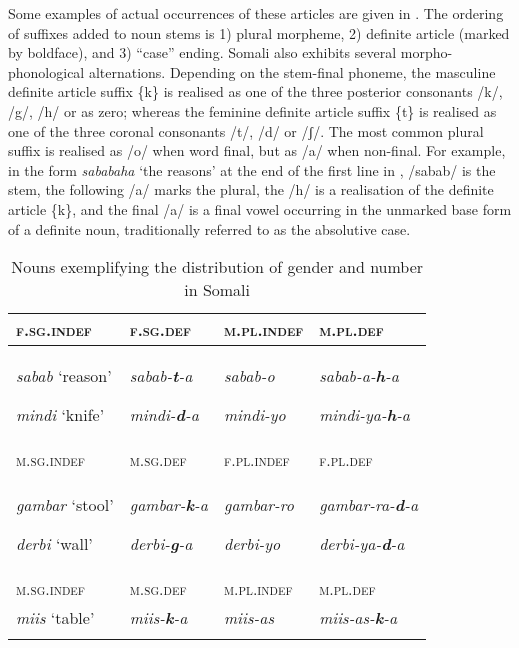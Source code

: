\documentclass[output=paper]{langsci/langscibook}
\begin{document}
Some examples of actual occurrences of these articles are given in . The ordering of suffixes added to noun stems is 
1) plural morpheme, 
2) definite article (marked by boldface), 
and 3) “case” ending. Somali also exhibits several morpho-phonological alternations. Depending on the stem-final phoneme, the masculine definite article suffix \{k\} is realised as one of the three posterior consonants /k/, /g/, /h/ or as zero; whereas the feminine definite article suffix \{t\} is realised as one of the three coronal consonants /t/, /d/ or /ʃ/. The most common plural suffix is realised as /o/ when word final, but as /a/ when non-final. For example, in the form \textit{sababaha} ‘the reasons’ at the end of the first line in , /sabab/ is the stem, the following /a/ marks the plural, the /h/ is a realisation of the definite article \{k\}, and the final /a/ is a final vowel occurring in the unmarked base form of a definite noun, traditionally referred to as the absolutive case.
 
\begin{table}
\caption{Nouns exemplifying the distribution of gender and number in Somali}
\label{tab:2}

\begin{tabularx}{\textwidth}{XXXX}
\lsptoprule
{\textsc{f.sg.indef}} & {\textsc{f.sg.def}} & {\textsc{m.pl.indef}} & {\textsc{m.pl.def}}\\
\midrule
{\textit{sabab} ‘reason’}

{\textit{mindi} ‘knife’} & {\textit{sabab-}\textbf{\textit{t}}\textit{-a}}

{\textit{mindi-}\textbf{\textit{d}}\textit{-a}} & {\textit{sabab-o}}

{\textit{mindi-yo}} & {\textit{sabab-a-}\textbf{\textit{h}}\textit{-a}}

{\textit{mindi-ya-}\textbf{\textit{h}}\textit{-a}}\\
{\textsc{m.sg.indef}} & {\textsc{m.sg.def}} & {\textsc{f.pl.indef}} & {\textsc{f.pl.def}}\\
{\textit{gambar} ‘stool’}

{\textit{derbi} ‘wall’} & {\textit{gambar-}\textbf{\textit{k}}\textit{-a}}

{\textit{derbi-}\textbf{\textit{g}}\textit{-a}} & {\textit{gambar-ro}}

{\textit{derbi-yo}} & {\textit{gambar-ra-}\textbf{\textit{d}}\textit{-a}}

{\textit{derbi-ya-}\textbf{\textit{d}}\textit{-a}}\\
{\textsc{m.sg.indef}} & {\textsc{m.sg.def}} & {\textsc{m.pl.indef}} & {\textsc{m.pl.def}}\\
{\textit{miis} ‘table’} & {\textit{miis-}\textbf{\textit{k}}\textit{-a}} & {\textit{miis-as}} & {\textit{miis-as-}\textbf{\textit{k}}\textit{-a}}\\
\lspbottomrule
\end{tabularx}

\end{table} 
\end{document}
